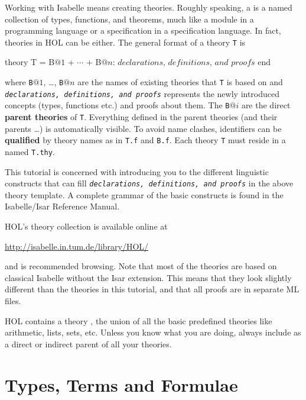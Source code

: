 Working with Isabelle means creating theories. Roughly speaking, a
 is a named collection of types, functions, and theorems,
much like a module in a programming language or a specification in a
specification language. In fact, theories in HOL can be either. The general
format of a theory \texttt{T} is
\begin{ttbox}
theory T = B\(@1\) + \(\cdots\) + B\(@n\):
\(\textit{declarations, definitions, and proofs}\)
end
\end{ttbox}
where \texttt{B}$@1$, \dots, \texttt{B}$@n$ are the names of existing
theories that \texttt{T} is based on and \texttt{\textit{declarations,
    definitions, and proofs}} represents the newly introduced concepts
(types, functions etc.) and proofs about them. The \texttt{B}$@i$ are the
direct \textbf{parent theories} of \texttt{T}.
Everything defined in the parent theories (and their parents \dots) is
automatically visible. To avoid name clashes, identifiers can be
\textbf{qualified} by theory names as in \texttt{T.f} and
\texttt{B.f}. Each theory \texttt{T} must
reside in a  named \texttt{T.thy}.

This tutorial is concerned with introducing you to the different linguistic
constructs that can fill \textit{\texttt{declarations, definitions, and
    proofs}} in the above theory template.  A complete grammar of the basic
constructs is found in the Isabelle/Isar Reference Manual.

HOL's theory collection is available online at
\begin{center}\small
    \url{http://isabelle.in.tum.de/library/HOL/}
\end{center}
and is recommended browsing. Note that most of the theories 
are based on classical Isabelle without the Isar extension. This means that
they look slightly different than the theories in this tutorial, and that all
proofs are in separate ML files.

\begin{warn}
  HOL contains a theory , the union of all the basic
  predefined theories like arithmetic, lists, sets, etc.  
  Unless you know what you are doing, always include 
  as a direct or indirect parent of all your theories.
\end{warn}


\section{Types, Terms and Formulae}
\label{sec:TypesTermsForms}

